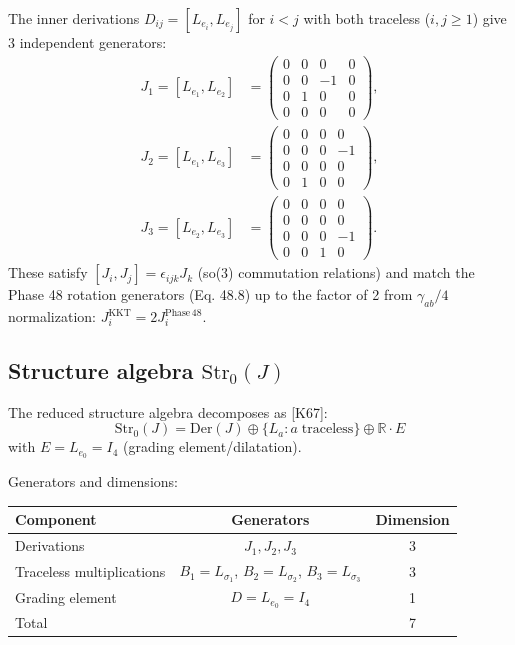 The inner derivations $D_{ij} = [L_{e_i}, L_{e_j}]$ for $i < j$ with both
traceless ($i,j \geq 1$) give 3 independent generators:
\begin{align}
  J_1 = [L_{e_1}, L_{e_2}] &= \begin{pmatrix} 0&0&0&0\\0&0&-1&0\\0&1&0&0\\0&0&0&0 \end{pmatrix}, \\
  J_2 = [L_{e_1}, L_{e_3}] &= \begin{pmatrix} 0&0&0&0\\0&0&0&-1\\0&0&0&0\\0&1&0&0 \end{pmatrix}, \\
  J_3 = [L_{e_2}, L_{e_3}] &= \begin{pmatrix} 0&0&0&0\\0&0&0&0\\0&0&0&-1\\0&0&1&0 \end{pmatrix}.
\end{align}
These satisfy $[J_i, J_j] = \epsilon_{ijk} J_k$ (so(3) commutation relations)
and match the Phase 48 rotation generators (Eq. 48.8) up to the factor of 2
from $\gamma_{ab}/4$ normalization:
$J_i^{\mathrm{KKT}} = 2 J_i^{\mathrm{Phase\,48}}$.

\subsection{Structure algebra $\mathrm{Str}_0(J)$}

The reduced structure algebra decomposes as [K67]:
\begin{equation}
  \mathrm{Str}_0(J) = \mathrm{Der}(J) \oplus \{L_a : a\;\mathrm{traceless}\}
  \oplus \mathbb{R} \cdot E
\end{equation}
with $E = L_{e_0} = I_4$ (grading element/dilatation).

Generators and dimensions:
\begin{center}
\begin{tabular}{lcc}
  Component & Generators & Dimension \\
  \hline
  Derivations & $J_1, J_2, J_3$ & 3 \\
  Traceless multiplications & $B_1 = L_{\sigma_1}$, $B_2 = L_{\sigma_2}$,
    $B_3 = L_{\sigma_3}$ & 3 \\
  Grading element & $D = L_{e_0} = I_4$ & 1 \\
  \hline
  Total & & 7 \\
\end{tabular}
\end{center}

